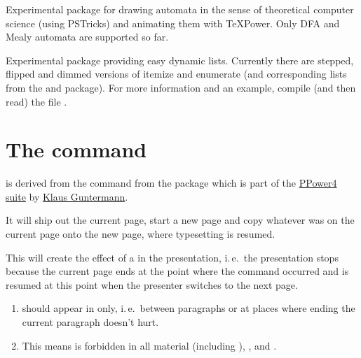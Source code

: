 \begin{slide}
Experimental package for drawing automata in the sense of theoretical computer
science (using PSTricks) and animating them with TeXPower.  Only DFA and Mealy
automata are supported so far.

\newslide

Experimental package providing easy dynamic lists. Currently there are stepped, flipped and dimmed versions of itemize
and enumerate (and corresponding lists from the  and  package).  For more information
and an example, compile (and then read) the file .

\newslide

%
\section{The  command}\label{Sec:pause}
 is derived from the  command from the package
\href{http://www-sp.iti.informatik.tu-darmstadt.de/software/ppower4/pp4sty.zip}{} which is part of the
\href{http://www-sp.iti.informatik.tu-darmstadt.de/software/ppower4/}{PPower4 suite} by
\href{mailto:guntermann@iti.informatik.tu-darmstadt.de}{Klaus Guntermann}.

  It will ship out the current page, start a new page and copy whatever was on the current page onto the new page, where
  typesetting is resumed.


  This will create the effect of a  in the presentation, i.\,e.\ the presentation stops because the
  current page ends at the point where the  command occurred and is resumed at this point when the
  presenter switches to the next page.

  \newslide

  \begin{enumerate}
  \item {} should appear in  only, i.\,e.\ between paragraphs or at places where
    ending the current paragraph doesn't hurt.

  \item This means  is forbidden in all  material (including ),
    , and .


\end{enumerate}
\end{slide}
